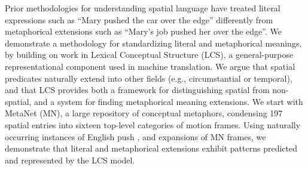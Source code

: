 Prior methodologies for understanding spatial language have treated literal expressions such as ``Mary pushed the car over the edge'' differently from metaphorical extensions such as ``Mary's job pushed her over the edge''.  We demonstrate a methodology for standardizing literal and metaphorical meanings, by building on work in Lexical Conceptual Structure (LCS), a general-purpose representational component used in machine translation.  We argue that spatial predicates naturally extend into other fields (e.g., circumstantial or temporal), and that LCS provides both a framework for distinguishing spatial from non-spatial, and a system for finding metaphorical meaning extensions. We start with MetaNet (MN), a large repository of conceptual metaphors, condensing 197 spatial entries into sixteen top-level categories of motion frames.  Using naturally occurring instances of English push , and expansions of MN frames, we demonstrate that literal and metaphorical extensions exhibit patterns predicted and represented by the LCS model.
